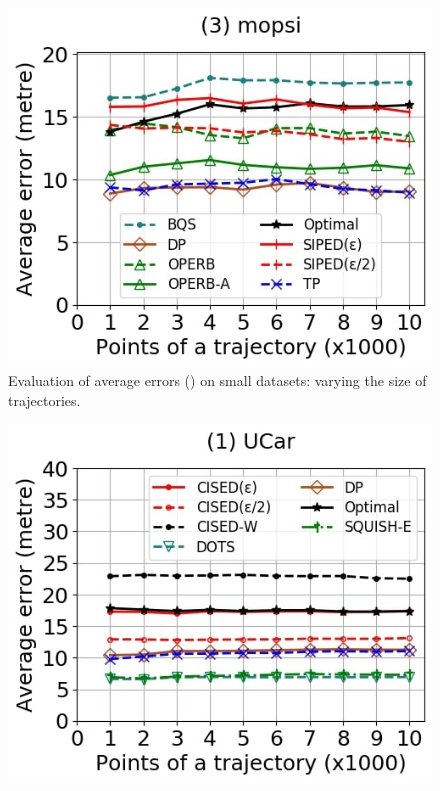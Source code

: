 {\begin{figure}[tb!]
	\includegraphics[scale=0.250]{Figures/Exp-PED-error-size-mopsi.jpg}		
	\vspace{-2ex}
	\caption{\small Evaluation of average errors (\ped) on small datasets: varying the size of
		trajectories.}
	\label{fig:ae-ped-size}
	\vspace{-2ex}
\end{figure}
\begin{figure}[tb!]
	\centering
	\includegraphics[scale=0.250]{Figures/Exp-SED-error-size-service.jpg} 	\hspace{0.5ex}

\end{figure}}
